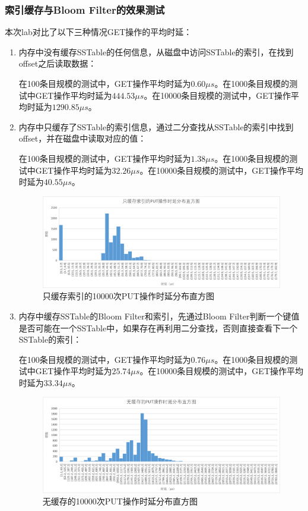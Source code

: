 \documentclass[fontset=windows]{article}
\begin{document}
\subsubsection{索引缓存与Bloom Filter的效果测试}
本次lab对比了以下三种情况GET操作的平均时延：
\begin{enumerate}
    \item 内存中没有缓存SSTable的任何信息，从磁盘中访问SSTable的索引，在找到offset之后读取数据：
    
	在100条目规模的测试中，GET操作平均时延为$0.60 \mu s$。在1000条目规模的测试中GET操作平均时延为$444.53 \mu s$。在10000条目规模的测试中，GET操作平均时延为$1290.85 \mu s$。
    
    \item 内存中只缓存了SSTable的索引信息，通过二分查找从SSTable的索引中找到offset，并在磁盘中读取对应的值：
    
    在100条目规模的测试中，GET操作平均时延为$1.38 \mu s$。在1000条目规模的测试中GET操作平均时延为$32.26 \mu s$。在10000条目规模的测试中，GET操作平均时延为$40.55 \mu s$。
    
\begin{figure}[h!]
\centering
\includegraphics[scale=0.5]{put_part_cache}
\caption{只缓存索引的10000次PUT操作时延分布直方图}
\label{fig:put_part_cache}
\end{figure}
    
    \item 内存中缓存SSTable的Bloom Filter和索引，先通过Bloom Filter判断一个键值是否可能在一个SSTable中，如果存在再利用二分查找，否则直接查看下一个SSTable的索引：
    
    在100条目规模的测试中，GET操作平均时延为$0.76 \mu s$。在1000条目规模的测试中GET操作平均时延为$25.74 \mu s$。在10000条目规模的测试中，GET操作平均时延为$33.34 \mu s$。
    
\begin{figure}[h!]
\centering
\includegraphics[scale=0.5]{put_no_cache}
\caption{无缓存的10000次PUT操作时延分布直方图}
\label{fig:put_no_cache}
\end{figure} 


\end{enumerate}
\end{document}

